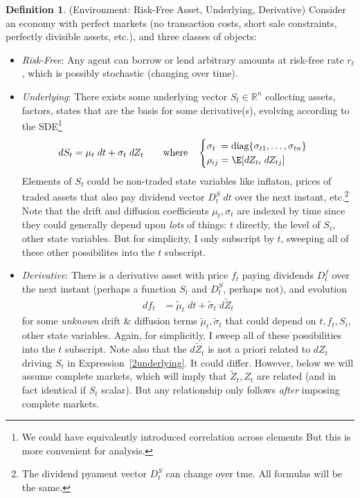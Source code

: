 \documentclass[12pt]{article}
\theoremstyle{plain}
\theoremstyle{definition}
\newtheorem{defn}[thm]{Definition}
\theoremstyle{remark}
\newcommand{\diag}{\text{diag}}
\newcommand{\Rn}{\mathbb{R}^n}
\begin{document}
\begin{defn}(Environment: Risk-Free Asset, Underlying, Derivative)
Consider an economy with perfect markets (no transaction costs, short
sale constraints, perfectly divisible assets, etc.), and three classes
of objects:
\begin{itemize}
  \item \emph{Risk-Free}:
    Any agent can borrow or lend arbitrary amounts at risk-free rate
    $r_t$, which is possibly stochastic (changing over time).

  \item \emph{Underlying}:
    There exists some underlying vector $S_t\in\Rn$ collecting assets,
    factors, states that are the basis for some derivative(s),
    evolving according to the SDE\footnote{%
      We could have equivalently introduced correlation across elements
      But this is more convenient for analysis.
    }
    \begin{align}
      dS_{t} = \mu_{t}\;dt + \sigma_{t}\;dZ_{t}
      \qquad \text{where}\quad
      \begin{cases}
        \sigma_t \;= \diag\{\sigma_{t1},\ldots,\sigma_{tn}\} \\
        \rho_{ij}=\E[dZ_{ti}\;dZ_{tj}]
      \end{cases}
      \label{2underlying}
    \end{align}
    Elements of $S_t$ could be non-traded state variables like
    inflaton, prices of traded assets that also pay dividend vector
    $D_{t}^S\;dt$ over the next instant, etc.\footnote{%
      The dividend pyament vector $D_{t}^S$ can change over tme.
      All formulas will be the same.
    }
    Note that the drift and diffusion coefficients
    $\mu_{t},\sigma_{t}$ are indexed by time since they could
    generally depend upon \emph{lots} of things: $t$ directly, the level
    of $S_{t}$, other state variables. But for simplicity, I only
    subscript by $t$, sweeping all of these other possibilites into the
    $t$ subscript.

  \item \emph{Derivative}:
    There is a derivative asset with price $f_t$ paying dividends
    $D_t^f$ over the next instant (perhaps a function $S_{t}$ and
    $D_{t}^S$, perhaps not), and evolution
    \begin{align}
      df_{t}
      &=
      \tilde{\mu}_t
      \; dt
      +
      \tilde{\sigma}_t
      \;d\tilde{Z}_t
      \label{2dfi}
    \end{align}
    for some \emph{unknown} drift \& diffusion terms
    $\tilde{\mu}_t,\tilde{\sigma}_t$ that could depend on $t,f_t,S_t,$
    other state variables.
    Again, for simplicitly, I sweep all of these possibilities into the
    $t$ subscript.
    Note also that the $d\tilde{Z}_t$ is not a priori related to $dZ_t$
    driving $S_t$ in Expression~\ref{2underlying}.
    It could differ. However, below we will assume complete markets,
    which will imply that $\tilde{Z}_t,Z_t$ are related (and in fact
    identical if $S_t$ scalar).
    But any relationship only follows \emph{after} imposing complete
    markets.


\end{itemize}
\end{defn}
\end{document}
